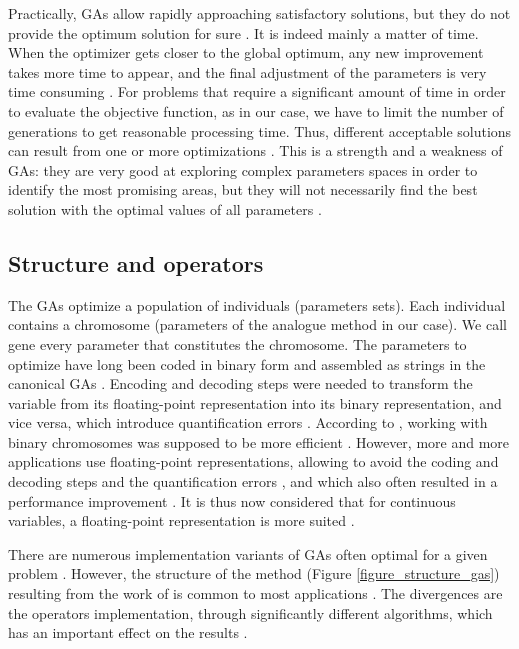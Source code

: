 \documentclass{ametsoc}
\begin{document}
Practically, GAs allow rapidly approaching satisfactory solutions, but they do not provide the optimum solution for sure \citep{Zitzler2004a}. It is indeed mainly a matter of time. When the optimizer gets closer to the global optimum, any new improvement takes more time to appear, and the final adjustment of the parameters is very time consuming \citep{Back1993a}. For problems that require a significant amount of time in order to evaluate the objective function, as in our case, we have to limit the number of generations to get reasonable processing time. Thus, different acceptable solutions can result from one or more optimizations \citep{Holland1992b}. This is a strength and a weakness of GAs: they are very good at exploring complex parameters spaces in order to identify the most promising areas, but they will not necessarily find the best solution with the optimal values of all parameters \citep{Holland1992b}.


\subsection{Structure and operators}

The GAs optimize a population of individuals (parameters sets). Each individual contains a chromosome (parameters of the analogue method in our case). We call gene every parameter that constitutes the chromosome. The parameters to optimize have long been coded in binary form and assembled as strings in the canonical GAs \citep{Goldberg1989}. Encoding and decoding steps were needed to transform the variable from its floating-point representation into its binary representation, and vice versa, which introduce quantification errors \citep{Haupt2004}. According to \citet{Holland1992b}, working with binary chromosomes was supposed to be more efficient \citep{Goldberg1990a, Back1993b}. However, more and more applications use floating-point representations, allowing to avoid the coding and decoding steps and the quantification errors \citep{Haupt2004}, and which also often resulted in a performance improvement \citep{Goldberg1990a}. It is thus now considered that for continuous variables, a floating-point representation is more suited \citep{Michalewicz1996, Herrera1998a, Haupt2004, Back1996b, Gaffney2010a}. 

There are numerous implementation variants of GAs often optimal for a given problem \citep{Hart1991a,Schraudolph1992a}. However, the structure of the method (Figure \ref{figure_structure_gas}) resulting from the work of \citet{Holland1992b} is common to most applications \citep{Back1993b}. The divergences are the operators implementation, through significantly different algorithms, which has an important effect on the results \citep{Gaffney2010a}.
\end{document}
